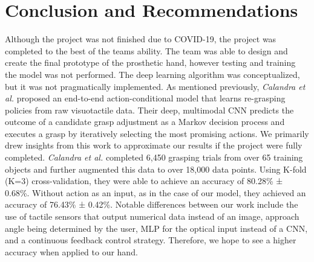 \documentclass[11.5pt]{article}
\begin{document}
\section{Conclusion and Recommendations}
Although the project was not finished due to COVID-19, the project was completed to the best of the teams ability. The team was able to design and create the final prototype of the prosthetic hand, however testing and training the model was not performed. The deep learning algorithm was conceptualized, but it was not pragmatically implemented. As mentioned previously, \emph{Calandra et al.} proposed an end-to-end action-conditional model that learns re-grasping policies from raw visuotactile data. Their deep, multimodal CNN predicts the outcome of a candidate grasp adjustment as a Markov decision process and executes a grasp by iteratively selecting the most promising actions. We primarily drew insights from this work to approximate our results if the project were fully completed. \emph{Calandra et al.} completed 6,450 grasping trials from over 65 training objects and further augmented this data to over 18,000 data points. Using K-fold (K=3) cross-validation, they were able to achieve an accuracy of 80.28\% ± 0.68\%. Without action as an input, as in the case of our model, they achieved an accuracy of 76.43\% ± 0.42\%. Notable differences between our work include the use of tactile sensors that output numerical data instead of an image, approach angle being determined by the user, MLP for the optical input instead of a CNN, and a continuous feedback control strategy. Therefore, we hope to see a higher accuracy when applied to our hand. \\
\end{document}
